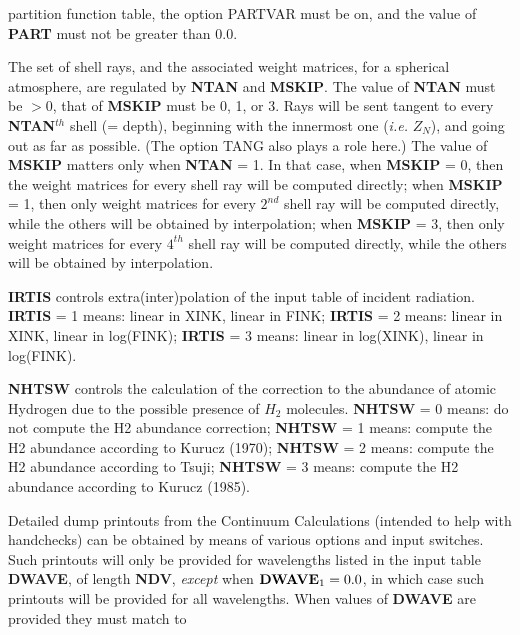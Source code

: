 partition function table, the option PARTVAR must be on, and the value of
{\bf PART} must not be greater than 0.0.
\blankline
\blankline
\centerline{}
\space \noindent
The set of shell rays, and the associated weight matrices, for a spherical
atmosphere, are regulated by {\bf NTAN} and {\bf MSKIP}. The value of {\bf NTAN}
must be $> 0$, that of {\bf MSKIP} must be 0, 1, or 3. \np
Rays will be sent tangent to every {\bf NTAN}$^{th}$ shell (= depth), 
beginning with the innermost one ({\it i.e.} $Z_N$), 
and going out as far as possible. (The
option TANG also plays a role here.) \np
The value of {\bf MSKIP} matters only
when {\bf NTAN} = 1. In that case, \np
when {\bf MSKIP} = 0, then the weight matrices
for every shell ray will be computed directly; \np
when {\bf MSKIP} = 1, then
only weight matrices for every $2^{nd}$ shell ray will be computed directly,
while the others will be obtained by interpolation; \np
when {\bf MSKIP} = 3,
then only weight matrices for every $4^{th}$ shell ray will be computed
directly, while the others will be obtained by interpolation.
\blankline
\blankline
\centerline{}
\space \noindent
{\bf IRTIS} controls extra(inter)polation of the input table
of incident radiation. \np
{\bf IRTIS} = 1 means: linear in XINK, linear in FINK; \np
{\bf IRTIS} = 2 means: linear in XINK, linear in log(FINK); \np
{\bf IRTIS} = 3 means: linear in log(XINK), linear in log(FINK).
\ej
\centerline{}
\space \noindent
{\bf NHTSW} controls the calculation of the correction to the abundance of
atomic Hydrogen due to the possible presence of $H_2$ molecules. \np
{\bf NHTSW} = 0 means: do not compute the H2 abundance correction; \np
{\bf NHTSW} = 1 means: compute the H2 abundance according to Kurucz 
(1970); \np
{\bf NHTSW} = 2 means: compute the H2 abundance according to Tsuji; \np
{\bf NHTSW} = 3 means: compute the H2 abundance according to Kurucz (1985).
\blankline
\blankline
\centerline{}
\space \noindent
Detailed dump printouts from the Continuum Calculations (intended to help
with handchecks) can be obtained by means of various options
and input switches. Such printouts will only be provided for wavelengths listed
in the input table {\bf DWAVE}, of length {\bf NDV}, {\it except} when
${\bf DWAVE}_1 = 0.0$, in which case such printouts will be provided for all
wavelengths.  When values of {\bf DWAVE} are provided they must match to
